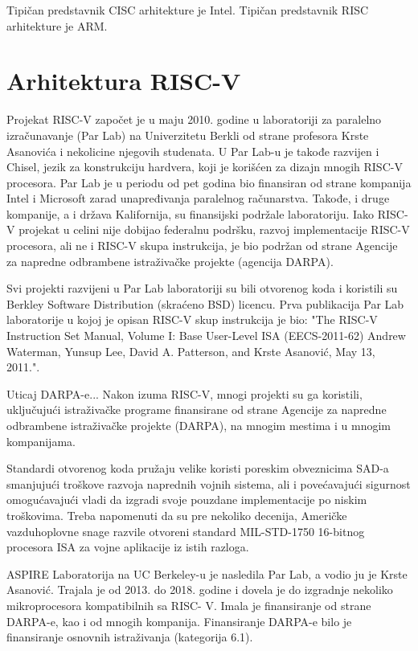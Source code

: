 \documentclass[12pt,oneside]{memoir}
\begin{document}
Tipičan predstavnik CISC arhitekture je Intel. Tipičan predstavnik RISC arhitekture je ARM.

\section{Arhitektura RISC-V}
 
Projekat RISC-V započet je u maju 2010. godine u laboratoriji za paralelno 
izračunavanje (Par Lab) na Univerzitetu Berkli od strane profesora Krste Asanovića i 
nekolicine njegovih studenata. U Par Lab-u je takođe razvijen i Chisel, jezik za konstrukciju 
hardvera, koji je korišćen za dizajn mnogih RISC-V procesora. Par Lab je u periodu od pet godina 
bio finansiran od strane kompanija Intel i Microsoft zarad unapređivanja paralelnog računarstva.
Takođe, i druge kompanije, a i država Kalifornija, su finansijski podržale laboratoriju.
Iako RISC-V projekat u celini nije dobijao federalnu podršku, razvoj implementacije RISC-V 
procesora, ali ne i RISC-V skupa instrukcija, je bio podržan od strane  Agencije za napredne 
odbrambene istraživačke projekte (agencija DARPA). 

Svi projekti razvijeni u Par Lab laboratoriji su bili otvorenog koda i koristili su Berkley 
Software Distribution (skraćeno BSD) licencu. Prva publikacija Par Lab laboratorije u kojoj je 
opisan RISC-V skup instrukcija je bio:
"The RISC-V Instruction Set Manual, Volume I: Base User-Level ISA (EECS-2011-62)
Andrew Waterman, Yunsup Lee, David A. Patterson, and Krste Asanović, May 13, 2011.".

Uticaj DARPA-e...
Nakon izuma RISC-V, mnogi projekti su ga koristili, uključujući istraživačke programe finansirane 
od strane Agencije za napredne odbrambene istraživačke projekte (DARPA), na mnogim mestima i u 
mnogim kompanijama. 

Standardi otvorenog koda pružaju velike koristi poreskim obveznicima SAD-a smanjujući troškove 
razvoja naprednih vojnih sistema, ali i povećavajući sigurnost omogućavajući vladi da izgradi 
svoje pouzdane implementacije po niskim troškovima. Treba napomenuti da su pre nekoliko decenija, 
Američke vazduhoplovne snage razvile otvoreni standard MIL-STD-1750 16-bitnog procesora ISA za 
vojne aplikacije iz istih razloga.

ASPIRE Laboratorija na UC Berkeley-u je nasledila Par Lab, a vodio ju je Krste Asanović. Trajala 
je od 2013. do 2018. godine i dovela je do izgradnje nekoliko mikroprocesora kompatibilnih sa RISC-
V. Imala je finansiranje od strane DARPA-e, kao i od mnogih kompanija. Finansiranje DARPA-e bilo 
je finansiranje osnovnih istraživanja (kategorija 6.1).
\end{document}
